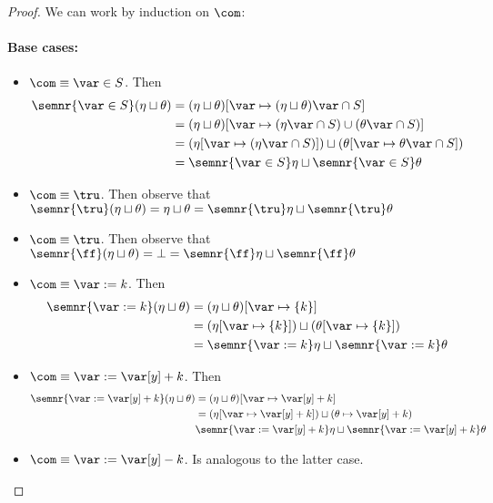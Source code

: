 \begin{proof}
  We can work by induction on \(\com\):
  \paragraph*{Base cases: \\}
  \noindent
  \begin{itemize}
  \item \(\com \equiv \var \in S\). Then
    \begin{align*}
      \semnr{\var \in S}(\eta \sqcup \theta) & = (\eta \sqcup \theta)[\var \mapsto (\eta \sqcup \theta)\var \cap S] \\
                                             & = (\eta \sqcup \theta)[\var \mapsto (\eta\var \cap S) \cup (\theta\var \cap S)] \\
                                             & = (\eta[\var \mapsto (\eta\var \cap S)]) \sqcup (\theta[\var \mapsto \theta\var \cap S]) \\
                                             & = \semnr{\var \in S}\eta \sqcup \semnr{\var \in S}\theta
    \end{align*}
    
  \item \(\com \equiv \tru\). Then observe that
    \(\semnr{\tru}(\eta \sqcup \theta) = \eta \sqcup \theta =
    \semnr{\tru}\eta \sqcup \semnr{\tru}\theta\)
  \item \(\com \equiv \tru\). Then observe that
    \(\semnr{\ff}(\eta \sqcup \theta) = \bot = \semnr{\ff}\eta \sqcup
    \semnr{\ff}\theta\)
  \item \(\com \equiv \var := k\). Then
    \begin{align*}
      \semnr{\var := k}(\eta \sqcup \theta) & = (\eta \sqcup \theta)[\var \mapsto \{k\}] \\
                                            & = (\eta[\var \mapsto \{k\}]) \sqcup (\theta[\var \mapsto \{k\}]) \\
                                            & = \semnr{\var := k}\eta \sqcup \semnr{\var := k}\theta
    \end{align*}
  \item \(\com \equiv \var := \var[y] + k\). Then
    \begin{align*}
      \semnr{\var := \var[y] + k}(\eta \sqcup \theta) & = (\eta \sqcup \theta)[\var \mapsto \var[y] + k] \\
                                                      & = (\eta[\var \mapsto \var[y] + k]) \sqcup (\theta \mapsto \var[y] + k) \\
                                                      & \semnr{\var := \var[y] + k}\eta \sqcup \semnr{\var := \var[y] + k}\theta
    \end{align*}
  \item \(\com \equiv \var := \var[y] - k\). Is analogous to the
    latter case.
  \end{itemize}


\end{proof}
